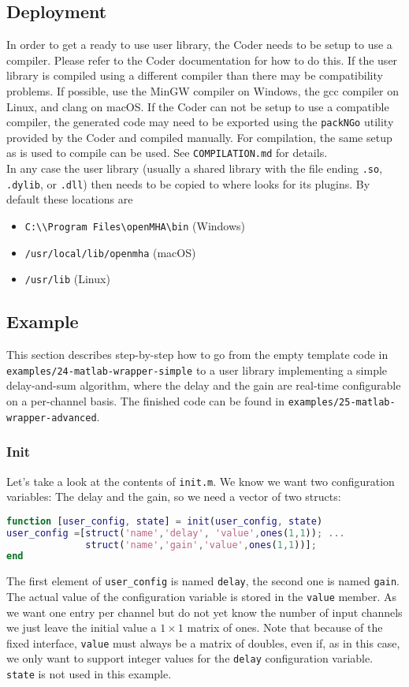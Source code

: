 \documentclass[11pt,a4paper,twoside]{article}
\newcommand{\+}{\discretionary{\mbox{\scriptsize$\hookleftarrow$}}{}{}}
\begin{document}
\subsection{Deployment}
\label{subsec:Deployment}
In order to get a ready to use user library, the \Matlab{} Coder needs to be
setup to use a compiler. Please refer to the \Matlab{} Coder documentation for
how to do this. If the user library is compiled using a different compiler than
\mha{} there may be compatibility problems. If possible, use the MinGW
compiler on Windows, the gcc compiler on Linux, and clang on macOS. If the \Matlab{} Coder
can not be setup to use a compatible compiler, the generated code may need to be
exported using the \texttt{packNGo} utility provided by the \Matlab{} Coder and
compiled manually. For compilation, the same setup as is used to compile \mha{}
can be used. See \texttt{COMPILATION.md} for details. \\
In any case the user library (usually a shared library with the file ending
\texttt{.so}, \texttt{.dylib}, or \texttt{.dll}) then needs to be copied to where
\mha{} looks for its plugins. By default these locations are
\begin{itemize}
\item \texttt{C:\textbackslash\textbackslash Program Files\textbackslash openMHA\textbackslash bin} (Windows)
\item \texttt{/usr/local/lib/openmha} (macOS)
\item \texttt{/usr/lib} (Linux)
\end{itemize}
\subsection{Example}
This section describes step-by-step how to go from the empty template code
in \\ \texttt{examples/24-matlab-wrapper-simple}
to a user library implementing a simple delay-and-sum algorithm, where the delay
and the gain are real-time configurable on a per-channel basis.
The finished code can be found in \texttt{examples/25-matlab-wrapper-advanced}.
\subsubsection*{Init}
Let's take a look at the contents of \texttt{init.m}. We know we want two
configuration variables:
The delay and the gain, so we need a vector of two structs:
\begin{lstlisting}[language=Matlab]
function [user_config, state] = init(user_config, state)
user_config =[struct('name','delay', 'value',ones(1,1)); ...
              struct('name','gain','value',ones(1,1))];
end
\end{lstlisting}
The first element of \texttt{user\_config} is named \texttt{delay}, the second one is named
\texttt{gain}. The actual value of the configuration variable is stored in the \texttt{value}
member. As we want one entry per channel but do not yet know the number of input
channels we just leave the initial value a $1\times1$ matrix of ones. Note that because of
the fixed interface, \texttt{value} must always be a matrix of doubles, even if,
as in this case, we only want to support integer values for the \texttt{delay} configuration
variable. \texttt{state} is not used in this example.
\end{document}

